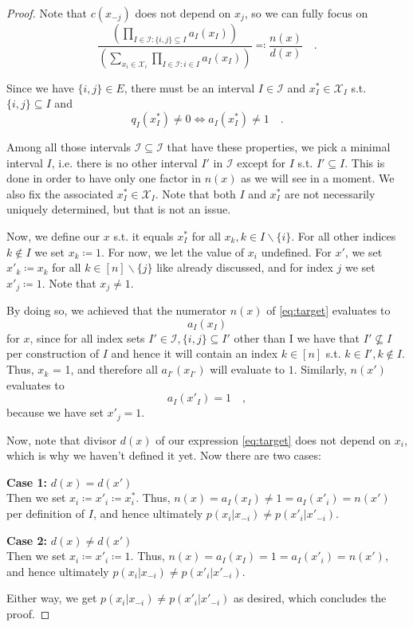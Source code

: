 \documentclass{article}
\theoremstyle{plain}
\begin{document}
\begin{proof}
    \medskip \noindent
    Note that $c(x_{-j})$ does not depend on $x_j$, so we can fully focus on
    \begin{equation}
        \frac{\left(\prod\limits_{I \in \mathcal{I}: \{i,j\} \subseteq I} a_I(x_I)\right)}{\left(\sum\limits_{x_i \in \mathcal{X}_i}\prod\limits_{I \in \mathcal{I}: i \in I} a_I(x_I)\right)} \eqqcolon \frac{n(x)}{d(x)} \quad . \label{eq:target} 
    \end{equation}

    \medskip \noindent
    Since we have $\{i,j\} \in E$, there must be an interval $I \in \mathcal{I}$ and $x_I^* \in \mathcal{X}_I$ s.t. $\{i,j\} \subseteq I$ and
    \[
        q_I(x_I^*) \neq 0 \iff a_I(x_I^*) \neq 1 \quad .
    \]

    \medskip \noindent
    Among all those intervals $\mathscr{I} \subseteq \mathcal{I}$ that have these properties, we pick a minimal interval $I$, i.e. there is no other interval $I'$ in $\mathscr{I}$ except for $I$ s.t. $I' \subseteq I$. This is done in order to have only one factor in $n(x)$ as we will see in a moment. We also fix the associated $x_I^* \in \mathcal{X}_I$. Note that both $I$ and $x_I^*$ are not necessarily uniquely determined, but that is not an issue.

    \medskip \noindent
    Now, we define our $x$ s.t. it equals $x_I^*$ for all $x_k, k \in I \backslash \{i\}$. For all other indices $k \not\in I$ we set $x_k \coloneqq 1$. For now, we let the value of $x_i$ undefined. For $x'$, we set $x'_k \coloneqq x_k$ for all $k \in [n] \backslash \{j\}$ like already discussed, and for index $j$ we set $x'_j \coloneqq 1$. Note that $x_j \neq 1$.

    \medskip \noindent
    By doing so, we achieved that the numerator $n(x)$ of \eqref{eq:target} evaluates to
    \[
        a_I(x_I)
    \]
    for $x$, since for all index sets $I' \in \mathcal{I}, \{i,j\} \subseteq I'$ other than I we have that $I' \not\subseteq I$ per construction of $I$ and hence it will contain an index $k \in [n]$ s.t. $k \in I', k \not\in I$. Thus, $x_k$ = 1, and therefore all $a_{I'}(x_{I'})$ will evaluate to $1$. Similarly, $n(x')$ evaluates to
    \[
        a_I(x'_I) = 1 \quad ,
    \]
    because we have set $x'_j = 1$.

    \bigskip \noindent
    Now, note that divisor $d(x)$ of our expression \eqref{eq:target} does not depend on $x_i$, which is why we haven't defined it yet. Now there are two cases:

    \medskip \noindent
    \textbf{Case 1:} $d(x) = d(x')$\\
    Then we set $x_i \coloneqq x'_i \coloneqq x_i^*$. Thus, $n(x) = a_I(x_I) \neq 1 = a_I(x'_i) = n(x')$ per definition of $I$, and hence ultimately $p(x_i | x_{-i}) \neq p(x'_i | x'_{-i})$.

    \medskip \noindent
    \textbf{Case 2:} $d(x) \neq d(x')$\\
    Then we set $x_i \coloneqq x'_i \coloneqq 1$. Thus, $n(x) = a_I(x_I) = 1 = a_I(x'_i) = n(x')$, and hence ultimately $p(x_i | x_{-i}) \neq p(x'_i | x'_{-i})$.

    \bigskip \noindent
    Either way, we get $p(x_i | x_{-i}) \neq p(x'_i | x'_{-i})$ as desired, which concludes the proof.
\end{proof}
\end{document}
